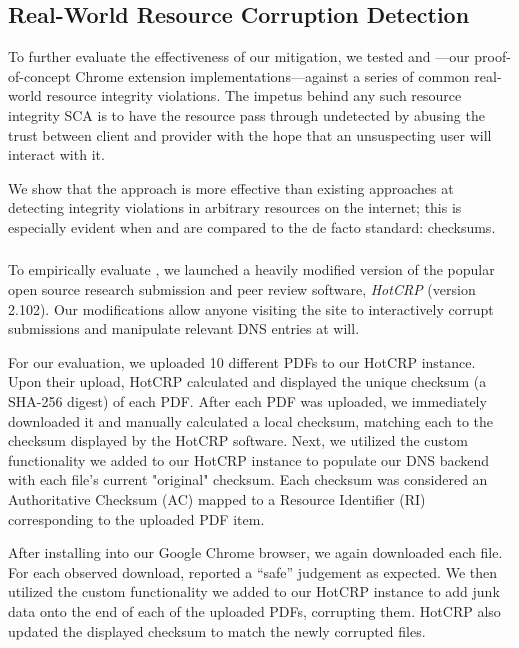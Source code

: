 \subsection{Real-World Resource Corruption Detection}

To further evaluate the effectiveness of our mitigation, we tested \DNSSYS{} and
\DHTSYS{}---our proof-of-concept \SYSTEM{} Chrome extension
implementations---against a series of common real-world resource integrity
violations. The impetus behind any such resource integrity SCA is to have the
resource pass through undetected by abusing the trust between client and
provider with the hope that an unsuspecting user will interact with it.

We show that the \SYSTEM{} approach is more effective than existing approaches
at detecting integrity violations in arbitrary resources on the internet; this
is especially evident when \DNSSYS{} and \DHTSYS{} are compared to the de facto
standard: checksums.

\subsubsection{\DNSSYS{}}

To empirically evaluate \DNSSYS{}, we launched a heavily modified version of the
popular open source research submission and peer review software, \emph{HotCRP}
(version 2.102). Our modifications allow anyone visiting the site to
interactively corrupt submissions and manipulate relevant DNS entries at will.

For our evaluation, we uploaded 10 different \CONFERENCE{} PDFs to our HotCRP
instance. Upon their upload, HotCRP calculated and displayed the unique checksum
(a SHA-256 digest) of each PDF. After each PDF was uploaded, we immediately
downloaded it and manually calculated a local checksum, matching each to the
checksum displayed by the HotCRP software. Next, we utilized the custom
functionality we added to our HotCRP instance to populate our DNS backend with
each file's current "original" checksum. Each checksum was considered an
Authoritative Checksum (AC) mapped to a Resource Identifier (RI) corresponding
to the uploaded PDF item.

After installing \DNSSYS{} into our Google Chrome browser, we again downloaded
each file. For each observed download, \DNSSYS{} reported a ``safe'' judgement
as expected. We then utilized the custom functionality we added to our HotCRP
instance to add junk data onto the end of each of the uploaded PDFs, corrupting
them. HotCRP also updated the displayed checksum to match the newly corrupted
files.

